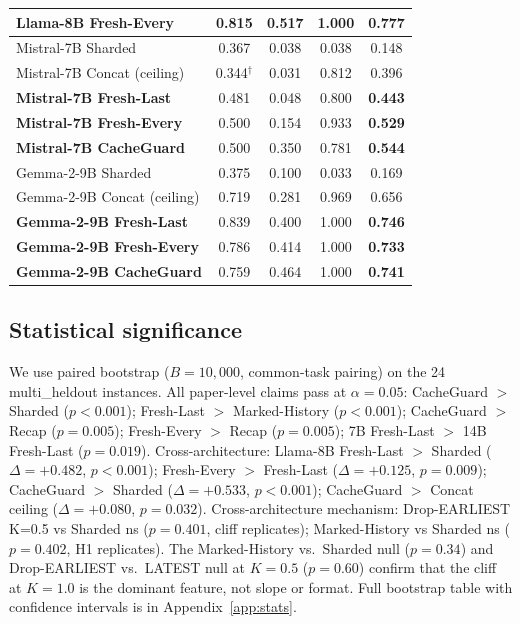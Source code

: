 \documentclass{article}
\begin{document}
\begin{table}[t]
\begin{tabular}{lcccc}
\textbf{Llama-8B Fresh-Every} & 0.815 & 0.517 & 1.000 & \textbf{0.777} \\
\midrule
Mistral-7B Sharded & 0.367 & 0.038 & 0.038 & 0.148 \\
Mistral-7B Concat (ceiling) & 0.344$^\dagger$ & 0.031 & 0.812 & 0.396 \\
\textbf{Mistral-7B Fresh-Last} & 0.481 & 0.048 & 0.800 & \textbf{0.443} \\
\textbf{Mistral-7B Fresh-Every} & 0.500 & 0.154 & 0.933 & \textbf{0.529} \\
\textbf{Mistral-7B CacheGuard} & 0.500 & 0.350 & 0.781 & \textbf{0.544} \\
\midrule
Gemma-2-9B Sharded & 0.375 & 0.100 & 0.033 & 0.169 \\
Gemma-2-9B Concat (ceiling) & 0.719 & 0.281 & 0.969 & 0.656 \\
\textbf{Gemma-2-9B Fresh-Last} & 0.839 & 0.400 & 1.000 & \textbf{0.746} \\
\textbf{Gemma-2-9B Fresh-Every} & 0.786 & 0.414 & 1.000 & \textbf{0.733} \\
\textbf{Gemma-2-9B CacheGuard} & 0.759 & 0.464 & 1.000 & \textbf{0.741} \\
\bottomrule
\end{tabular}
\end{table}

\subsection{Statistical significance}
\label{sec:stats}

We use paired bootstrap ($B=10{,}000$, common-task pairing) on the 24 multi\_heldout instances. All paper-level claims pass at $\alpha=0.05$: CacheGuard $>$ Sharded ($p<0.001$); Fresh-Last $>$ Marked-History ($p<0.001$); CacheGuard $>$ Recap ($p=0.005$); Fresh-Every $>$ Recap ($p=0.005$); 7B Fresh-Last $>$ 14B Fresh-Last ($p=0.019$). Cross-architecture: Llama-8B Fresh-Last $>$ Sharded ($\Delta{=}{+}0.482$, $p<0.001$); Fresh-Every $>$ Fresh-Last ($\Delta{=}{+}0.125$, $p=0.009$); CacheGuard $>$ Sharded ($\Delta{=}{+}0.533$, $p<0.001$); CacheGuard $>$ Concat ceiling ($\Delta{=}{+}0.080$, $p=0.032$). Cross-architecture mechanism: Drop-EARLIEST K=0.5 vs Sharded ns ($p=0.401$, cliff replicates); Marked-History vs Sharded ns ($p=0.402$, H1 replicates). The Marked-History vs.\ Sharded null ($p=0.34$) and Drop-EARLIEST vs.\ LATEST null at $K=0.5$ ($p=0.60$) confirm that the cliff at $K=1.0$ is the dominant feature, not slope or format. Full bootstrap table with confidence intervals is in Appendix~\ref{app:stats}.
\end{document}
